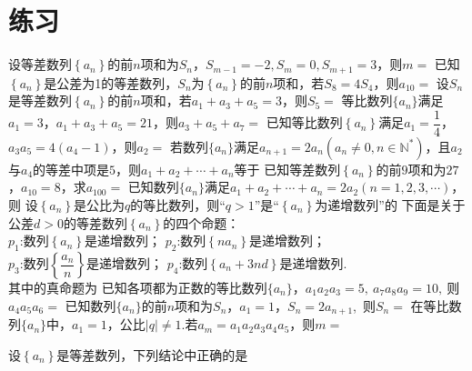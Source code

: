 \documentclass{BHCexam}
\begin{document}
\section{练习}
\begin{questions}
 
\question
设等差数列$\left\{a_n\right\}$的前$n$项和为$S_n$，$S_{m-1}=-2,S_m=0,S_{m+1}=3$，则$m=$\xx
{}
\qs
已知$\left\{a_n\right\}$是公差为1的等差数列，$S_n$为$\left\{a_n\right\}$的前$n$项和，若$S_8=4S_4$，则$a_{10}=$\xx
{}
\qs 设$S_n$是等差数列$\left\{a_n\right\}$的前$n$项和，若$a_1+a_3+a_5=3$，则$S_5=$\xx
{}
\qs 等比数列$\{a_n\}$满足$a_1=3$，$a_1+a_3+a_5=21$，则$ a_3+a_5+a_7= $\xx
{}
\qs 已知等比数列$\left\{a_n\right\}$满足$a_1=\dfrac{1}{4}$，$a_3a_5=4(a_4-1)$，则$a_2=$\xx
{}
\qs 若数列$\{a_n\}$满足$a_{n+1}=2a_n\left(a_n\ne 0, n\in\mathbb{N^*}\right)$，且$a_2$与$a_4$的等差中项是$ 5 $，则$ a_1+a_2+\cdots +a_n$等于\xx
{}
\qs
已知等差数列$ \left\{a_n\right\} $的前$ 9 $项和为$27$，$a_{10}=8$，求$a_{100}=$\xx
{}
\qs 已知数列$\{a_n\}$满足$ a_1+a_2+\cdots+a_n=2a_2 \left(n=1,2,3,\cdots\right)$，则\xx
{}
\qs
设$ \left\{a_n\right\} $是公比为$q$的等比数列，则“$ q>1$”是“$ \left\{a_n\right\} $为递增数列”的\xx
{}
\qs
下面是关于公差$d>0$的等差数列$ \left\{a_n\right\} $的四个命题：\\
$p_1$:数列$ \left\{a_n\right\} $是递增数列；\qquad
\phantom{p}$p_2$:数列$ \left\{na_n\right\} $是递增数列；\\
$p_3$:数列$ \left\{\dfrac{a_n}{n}\right\} $是递增数列；\qquad
$p_4$:数列$\left\{a_n+3nd\right\}$是递增数列.\\
其中的真命题为\xx
{}
\qs 已知各项都为正数的等比数列$\{a_n\}$，$a_1a_2a_3=5,~a_7a_8a_9=10,~  $则$ a_4a_5a_6= $\xx
{}
\qs 已知数列$\{a_n\}$的前$n$项和为$S_n$，$a_1=1$，$S_n=2a_{n+1}$,~则$S_n=$\xx
{}
\qs
在等比数列$\{a_n\}$中，$a_1=1$，公比$ |q|\ne 1 $.若$ a_m=a_1a_2a_3a_4a_5 $，则$ m= $\xx
{}

\qs 
设$ \left\{a_n\right\} $是等差数列，下列结论中正确的是\xx
{}


\end{questions}
\end{document}
